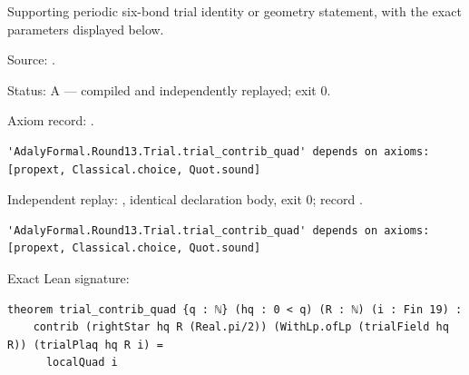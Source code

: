 \begin{theorem}[bp-419]
\label{bp-419}
\leanok
Supporting periodic six-bond trial identity or geometry statement, with the exact parameters displayed below.

\par Source: \texttt{}.
\par Status: A — compiled and independently replayed; exit 0.
\par Axiom record: \texttt{}.
\begin{verbatim}
'AdalyFormal.Round13.Trial.trial_contrib_quad' depends on axioms: [propext, Classical.choice, Quot.sound]
\end{verbatim}
\par Independent replay: \texttt{}, identical declaration body, exit 0; record \texttt{}.
\begin{verbatim}
'AdalyFormal.Round13.Trial.trial_contrib_quad' depends on axioms: [propext, Classical.choice, Quot.sound]
\end{verbatim}
\par Exact Lean signature:
\begin{verbatim}
theorem trial_contrib_quad {q : ℕ} (hq : 0 < q) (R : ℕ) (i : Fin 19) :
    contrib (rightStar hq R (Real.pi/2)) (WithLp.ofLp (trialField hq R)) (trialPlaq hq R i) =
      localQuad i
\end{verbatim}
\end{theorem}

